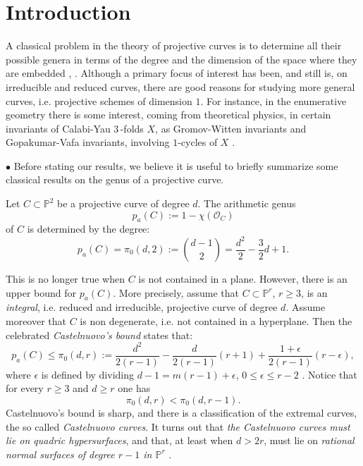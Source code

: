 \documentclass[9pt,a4paper]{amsart}
\theoremstyle{plain}
\theoremstyle{definition}
\theoremstyle{remark}
\begin{document}
\section{Introduction}



A classical problem in the theory of
projective curves is to determine  all their possible genera in
terms of the degree and the dimension of the space where they are
embedded \cite{EH}, \cite{H}. Although a primary focus of interest
has been, and still is, on irreducible and reduced curves, there are
good reasons for studying more general curves, i.e. projective
schemes of dimension $1$. For instance, in the enumerative geometry
there is some interest, coming from theoretical physics, in certain
invariants of Calabi-Yau 3\,-folds $X$, as Gromov-Witten invariants and
Gopakumar-Vafa invariants, involving $1$-cycles of $X$  \cite{Liu}.

\smallskip
$\bullet$
Before stating our results,
we believe it is useful to briefly summarize some classical results
on the genus of a projective curve.

\smallskip
Let $C\subset \mathbb P^2$ be a projective curve of degree $d$. The
arithmetic genus $$p_a(C):=1-\chi(\mathcal O_C)$$ of $C$ is
determined by the degree:
\begin{equation}\label{genusplane}
p_a(C)=\pi_0(d,2):=\binom{d-1}{2}=\frac{d^2}{2}-\frac{3}{2}d+1.
\end{equation}


\smallskip
This is no longer true when $C$ is not contained in a plane.
However, there is an upper bound for $p_a(C)$. More precisely,
assume that $C\subset \mathbb P^r$, $r\geq 3$, is an {\it integral},
i.e. reduced and irreducible, projective curve of degree $d$. Assume
moreover that $C$ is non degenerate, i.e. not contained in a hyperplane.
Then the celebrated {\it Castelnuovo's bound} states that:
\begin{equation}\label{Sabattino}
p_a(C)\leq
\pi_0(d,r):=\frac{d^2}{2(r-1)}-\frac{d}{2(r-1)}(r+1)+\frac{1+\epsilon}{2(r-1)}(r-\epsilon),
\end{equation}
where $\epsilon$ is defined by dividing $d-1=m(r-1)+\epsilon$,
$0\leq \epsilon\leq r-2$ \cite[Theorem (3.7), p. 87]{EH}.
Notice that for every $r\geq 3$ and $d\geq
r$ one has
\begin{equation}\label{decr}
\pi_0(d,r)<\pi_0(d,r-1).
\end{equation}
Castelnuovo's bound is sharp, and there is a classification of the
extremal curves, the so called {\it Castelnuovo curves}. It turns
out that {\it the Castelnuovo curves must lie on quadric
hypersurfaces}, and that, at least when $d>2r$, must lie on  {\it
rational normal surfaces of degree $r-1$ in $\mathbb P^r$}
\cite[Theorem (3.11), p. 91]{EH}.
\end{document}
